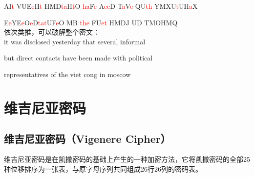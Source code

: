 AI\textcolor{red}{t} VUE\textcolor{red}{e}H\textcolor{red}{t} HMD\textcolor{red}{ta}H\textcolor{red}{t}O \textcolor{red}{ha}F\textcolor{red}{e} A\textcolor{red}{ee}D T\textcolor{red}{a}V\textcolor{red}{e} QU\textcolor{red}{th} YMXU\textcolor{red}{t}UH\textcolor{red}{a}X

E\textcolor{red}{e}YE\textcolor{red}{e}O\textcolor{red}{e}D\textcolor{red}{ta}\textcolor{red}{t}UF\textcolor{red}{e}O MB \textcolor{red}{the} FU\textcolor{red}{et} HMDJ UD TMOHMQ\\

依次类推，可以破解整个密文：\\

it was disclosed yesterday that several informal

but direct contacts have been made with political

representatives of the viet cong in moscow

\newpage

\section{维吉尼亚密码}

\subsection{维吉尼亚密码（Vigenere Cipher）}

维吉尼亚密码是在凯撒密码的基础上产生的一种加密方法，它将凯撒密码的全部25种位移排序为一张表，与原字母序列共同组成26行26列的密码表。\\

